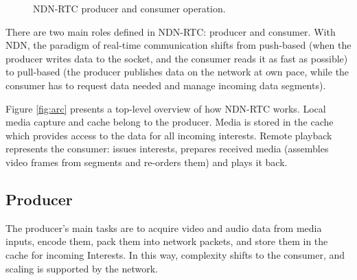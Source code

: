 \documentclass{icn/sig-alternate-2012} %
\newcommand{\ndnrtcName}{NDN-RTC} %
\begin{document}
\begin{figure}[t!]
\centering
{}\qquad
{}
\caption{\ndnrtcName{} producer and consumer operation.}
\end{figure}



There are two main roles defined in \ndnrtcName{}: producer and consumer. With NDN, the paradigm of real-time communication shifts from push-based (when the producer writes data to the socket, and the consumer reads it as fast as possible) to pull-based (the producer publishes data on the network at own pace, while the consumer has to request data needed and manage incoming data segments).

%

Figure \ref{fig:arc} presents a top-level overview of how \ndnrtcName{} works. Local media capture and cache belong to the producer. Media is stored in the cache which provides access to the data for all incoming interests. Remote playback represents the consumer: issues interests, prepares received media (assembles video frames from segments and re-orders them) and plays it back.

\subsection{Producer}
The producer's main tasks are to acquire video and audio data from media inputs, encode them, pack them into network packets, and store them in the cache for incoming Interests. In this way, complexity shifts to the consumer, and scaling is supported by the network.
\end{document}
